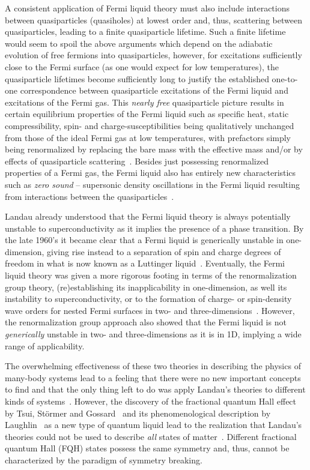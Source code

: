 A consistent application of Fermi liquid theory must also include interactions between quasiparticles (quasiholes) at lowest order and, thus, scattering between quasiparticles, leading to a finite quasiparticle lifetime.
Such a finite lifetime would seem to spoil the above arguments which depend on the adiabatic evolution of free fermions into quasiparticles, however, for excitations sufficiently close to the Fermi surface (as one would expect for low temperatures), the quasiparticle lifetimes become sufficiently long to justify the established one-to-one correspondence between quasiparticle excitations of the Fermi liquid and excitations of the Fermi gas.
This \textit{nearly free} quasiparticle picture results in certain equilibrium properties of the Fermi liquid such as specific heat, static compressibility, spin- and charge-susceptibilities being qualitatively unchanged from those of the ideal Fermi gas at low temperatures, with prefactors simply being renormalized by replacing the bare mass with the effective mass and/or by effects of quasiparticle scattering~\cite{Pines1966,Coleman2015}.
Besides just possessing renormalized properties of a Fermi gas, the Fermi liquid also has entirely new characteristics such as \textit{zero sound} -- supersonic density oscillations in the Fermi liquid resulting from interactions between the quasiparticles~\cite{KeenPL1963,AbelPRL1966,MerminPR1967}.

Landau already understood that the Fermi liquid theory is always potentially unstable to superconductivity as it implies the presence of a phase transition.
By the late 1960's it became clear that a Fermi liquid is generically unstable in one-dimension, giving rise instead to a separation of spin and charge degrees of freedom in what is now known as a Luttinger liquid~\cite{LuttingerJMP1963,HaldaneJoPC1981}.
Eventually, the Fermi liquid theory was given a more rigorous footing in terms of the renormalization group theory, (re)establishing its inapplicability in one-dimension, as well its instability to superconductivity, or to the formation of charge- or spin-density wave orders for nested Fermi surfaces in two- and three-dimensions~\cite{BenfattoPRB1990,ShankarRMP1994}.
However, the renormalization group approach also showed that the Fermi liquid is not \textit{generically} unstable in two- and three-dimensions as it is in 1D, implying a wide range of applicability.

The overwhelming effectiveness of these two theories in describing the physics of many-body systems lead to a feeling that there were no new important concepts to find and that the only thing left to do was apply Landau's theories to different kinds of systems~\cite{Wen2004}.
However, the discovery of the fractional quantum Hall effect by Tsui, St\"ormer and Gossard~\cite{TsuiPRL1982} and its phenomenological description by Laughlin~\cite{LaughlinPRL1983} as a new type of quantum liquid lead to the realization that Landau's theories could not be used to describe \textit{all} states of matter~\cite{WenPRB1989,WenPRB1990}.
Different fractional quantum Hall (FQH) states possess the same symmetry and, thus, cannot be characterized by the paradigm of symmetry breaking.

